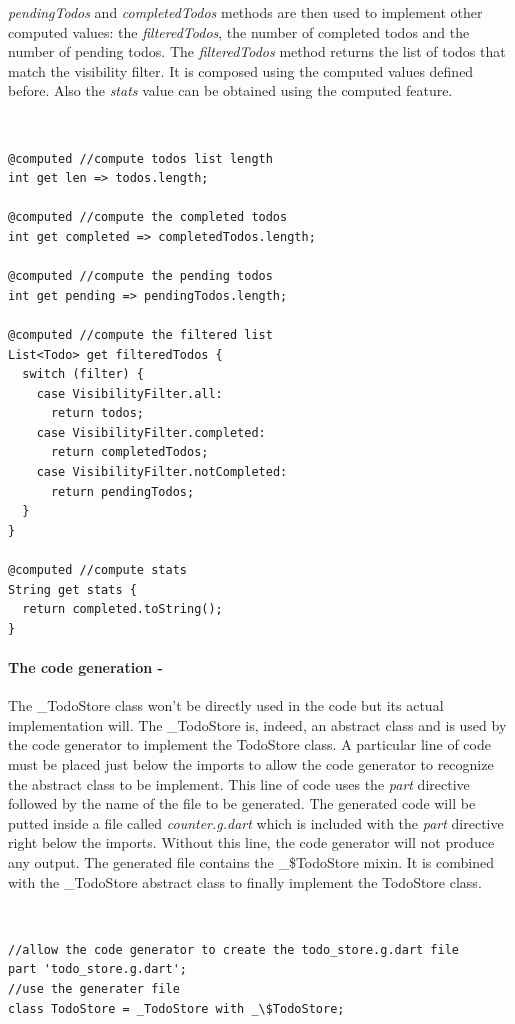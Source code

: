 \textit{pendingTodos} and \textit{completedTodos} methods are then used to implement other computed values: the \textit{filteredTodos}, the number of completed todos and the number of pending todos. The \textit{filteredTodos} method returns the list of todos that match the visibility filter. It is composed using the computed values defined before. Also the \textit{stats} value can be obtained using the computed feature.
\begin{code}
\mbox{}\\
 \mbox{}
		\label{code:2.14}
\begin{verbatim}
@computed //compute todos list length
int get len => todos.length;

@computed //compute the completed todos
int get completed => completedTodos.length;

@computed //compute the pending todos
int get pending => pendingTodos.length;

@computed //compute the filtered list
List<Todo> get filteredTodos {
  switch (filter) {
    case VisibilityFilter.all:
      return todos;
    case VisibilityFilter.completed:
      return completedTodos;
    case VisibilityFilter.notCompleted:
      return pendingTodos;
  }
}

@computed //compute stats
String get stats {
  return completed.toString();
}
\end{verbatim}
\mbox{}
\end{code}

\paragraph{The code generation - }
\label{subpar:todo_app_bloc_core_state}The \_TodoStore class won’t be directly used in the code but its actual implementation will. The \_TodoStore is, indeed, an abstract class and is used by the code generator to implement the TodoStore class. A particular line of code must be placed just below the imports to allow the code generator to recognize the abstract class to be implement. This line of code uses the \textit{part} directive followed by the name of the file to be generated. The generated code will be putted inside a file called \textit{counter.g.dart }which is included with the \textit{part} directive right below the imports. Without this line, the code generator will not produce any output. The generated file contains the \_\$TodoStore mixin. It is combined with the \_TodoStore abstract class to finally implement the TodoStore class.
\begin{code}
\mbox{}\\
 \mbox{}
		\label{code:2.14}
\begin{verbatim}
//allow the code generator to create the todo_store.g.dart file
part 'todo_store.g.dart';
//use the generater file
class TodoStore = _TodoStore with _\$TodoStore;
\end{verbatim}
\mbox{}
\end{code}

